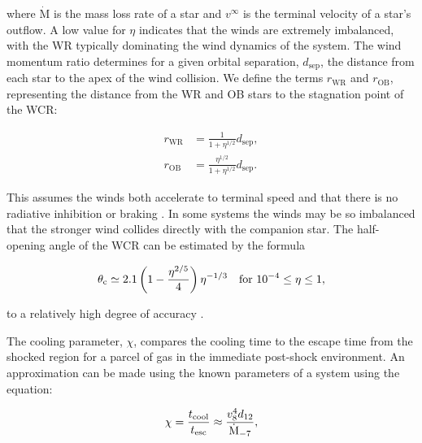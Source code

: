 \noindent
where $\dot{\text{M}}$ is the mass loss rate of a star and $v^\infty$ is the terminal velocity of a star's outflow.
A low value for $\eta$ indicates that the winds are extremely imbalanced, with the WR typically dominating the wind dynamics of the system.
The wind momentum ratio determines for a given orbital separation, $d_\text{sep}$, the distance from each star to the apex of the wind collision.
We define the terms $r_\text{WR}$ and $r_\text{OB}$, representing the distance from the WR and OB stars to the stagnation point of the WCR:

\begin{subequations}
  \begin{align}
    r_\text{WR} & = \frac{1}{1+\eta^{1/2}} d_\text{sep} , \\
    r_\text{OB} & = \frac{\eta^{1/2}}{1+\eta^{1/2}} d_\text{sep} .
  \end{align}
\end{subequations}

\noindent
This assumes the winds both accelerate to terminal speed and that there is no radiative inhibition \parencite{stevens_stagnation-point_1994} or braking \parencite{gayley_sudden_1997}.
In some systems the winds may be so imbalanced that the stronger wind collides directly with the companion star.
The half-opening angle of the WCR can be estimated by the formula

\begin{equation}
  \theta_\text{c} \simeq 2.1 \left( 1 - \frac{\eta^{2/5}}{4}\right) \eta^{-1/3} ~~~ \text{for} ~ 10^{-4} \leq \eta \leq 1 ,
\end{equation}

\noindent
to a relatively high degree of accuracy \parencite{eichler_particle_1993,pittardCollidingStellarWinds2018}.

The cooling parameter, $\chi$, compares the cooling time to the escape time from the shocked region for a parcel of gas in the immediate post-shock environment. An approximation can be made using the known parameters of a system using the equation:

\begin{equation}
    \label{eq:paper1-chi}
    \chi = \frac{t_\text{cool}}{t_\text{esc}} \approx \frac{v_8^4 d_{12}}{\dot{\text M}_{-7}} , 
\end{equation}

